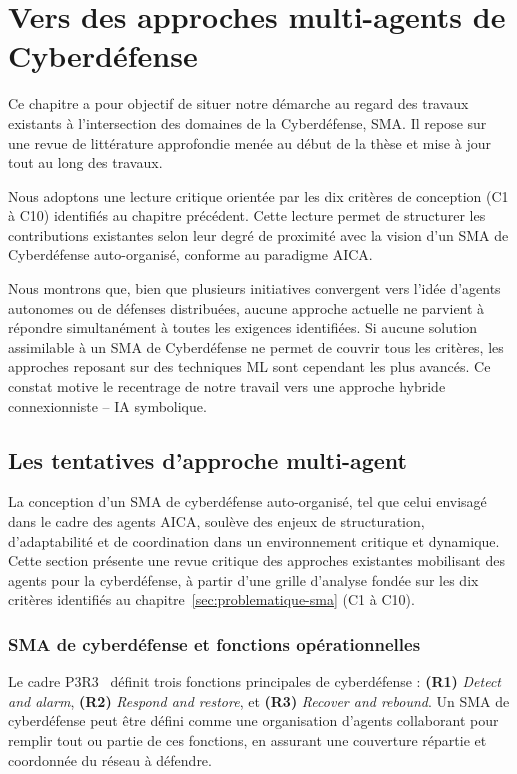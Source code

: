 \chapter{Vers des approches multi-agents de Cyberdéfense}

\noindent
Ce chapitre a pour objectif de situer notre démarche au regard des travaux existants à l'intersection des domaines de la Cyberdéfense, \ac{SMA}. Il repose sur une revue de littérature approfondie menée au début de la thèse et mise à jour tout au long des travaux.

Nous adoptons une lecture critique orientée par les dix critères de conception (C1 à C10) identifiés au chapitre précédent. Cette lecture permet de structurer les contributions existantes selon leur degré de proximité avec la vision d'un \ac{SMA} de Cyberdéfense auto-organisé, conforme au paradigme \ac{AICA}.

Nous montrons que, bien que plusieurs initiatives convergent vers l'idée d'agents autonomes ou de défenses distribuées, aucune approche actuelle ne parvient à répondre simultanément à toutes les exigences identifiées.
Si aucune solution assimilable à un \ac{SMA} de Cyberdéfense ne permet de couvrir tous les critères, les approches reposant sur des techniques \ac{ML} sont cependant les plus avancés.
Ce constat motive le recentrage de notre travail vers une approche hybride connexionniste -- \ac{IA} symbolique.

\section{Les tentatives d'approche multi-agent}\label{sec:sma-conception}


La conception d'un \ac{SMA} de cyberdéfense auto-organisé, tel que celui envisagé dans le cadre des agents \ac{AICA}, soulève des enjeux de structuration, d'adaptabilité et de coordination dans un environnement critique et dynamique. Cette section présente une revue critique des approches existantes mobilisant des agents pour la cyberdéfense, à partir d'une grille d'analyse fondée sur les dix critères identifiés au chapitre~\ref{sec:problematique-sma} (C1 à C10).

\subsection*{SMA de cyberdéfense et fonctions opérationnelles}

Le cadre P3R3~\cite{theron_p3r3_2021} définit trois fonctions principales de cyberdéfense : \textbf{(R1)} \textit{Detect and alarm}, \textbf{(R2)} \textit{Respond and restore}, et \textbf{(R3)} \textit{Recover and rebound}. Un \ac{SMA} de cyberdéfense peut être défini comme une organisation d'agents collaborant pour remplir tout ou partie de ces fonctions, en assurant une couverture répartie et coordonnée du réseau à défendre.

